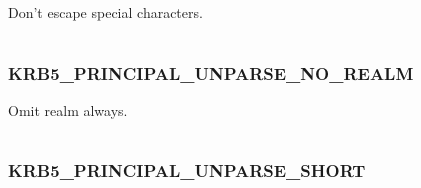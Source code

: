 \documentclass[letterpaper,10pt,english]{sphinxmanual}
\begin{document}
Don't escape special characters.

\begin{tabulary}{\linewidth}{|L|L|}
\hline

 & 
\\\hline
\end{tabulary}



\subsubsection{KRB5\_PRINCIPAL\_UNPARSE\_NO\_REALM}
\label{appdev/refs/macros/KRB5_PRINCIPAL_UNPARSE_NO_REALM:krb5-principal-unparse-no-realm}\label{appdev/refs/macros/KRB5_PRINCIPAL_UNPARSE_NO_REALM:krb5-principal-unparse-no-realm-data}\label{appdev/refs/macros/KRB5_PRINCIPAL_UNPARSE_NO_REALM::doc}

\begin{fulllineitems}
\label{appdev/refs/macros/KRB5_PRINCIPAL_UNPARSE_NO_REALM:KRB5_PRINCIPAL_UNPARSE_NO_REALM}
\end{fulllineitems}


Omit realm always.

\begin{tabulary}{\linewidth}{|L|L|}
\hline

 & 
\\\hline
\end{tabulary}



\subsubsection{KRB5\_PRINCIPAL\_UNPARSE\_SHORT}
\label{appdev/refs/macros/KRB5_PRINCIPAL_UNPARSE_SHORT::doc}\label{appdev/refs/macros/KRB5_PRINCIPAL_UNPARSE_SHORT:krb5-principal-unparse-short}\label{appdev/refs/macros/KRB5_PRINCIPAL_UNPARSE_SHORT:krb5-principal-unparse-short-data}

\begin{fulllineitems}
\label{appdev/refs/macros/KRB5_PRINCIPAL_UNPARSE_SHORT:KRB5_PRINCIPAL_UNPARSE_SHORT}
\end{fulllineitems}
\end{document}
